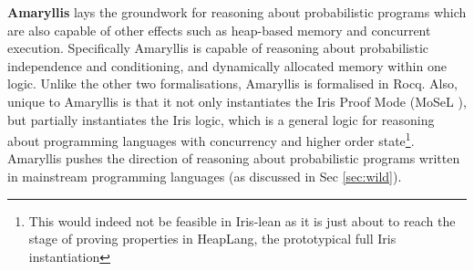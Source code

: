 \textbf{Amaryllis} \citep{amaryllis} lays the groundwork for reasoning about probabilistic programs which are also capable of other effects such
as heap-based memory and concurrent execution. Specifically Amaryllis is capable of reasoning about probabilistic independence and conditioning, and dynamically
allocated memory within one logic. Unlike the other two formalisations, Amaryllis is formalised in Rocq. Also, unique to Amaryllis is that it not only instantiates the
Iris Proof Mode (MoSeL \citep{mosel}), but partially instantiates the Iris logic, which is a general logic for reasoning about programming languages with concurrency and 
higher order state\footnote{This would indeed not be feasible in Iris-lean \citep{iris-lean-impl} as it is just about to reach the stage of proving properties in HeapLang, the prototypical full Iris instantiation}.
Amaryllis pushes the direction of reasoning about probabilistic programs written in mainstream programming languages (as discussed in Sec \ref{sec:wild}).

